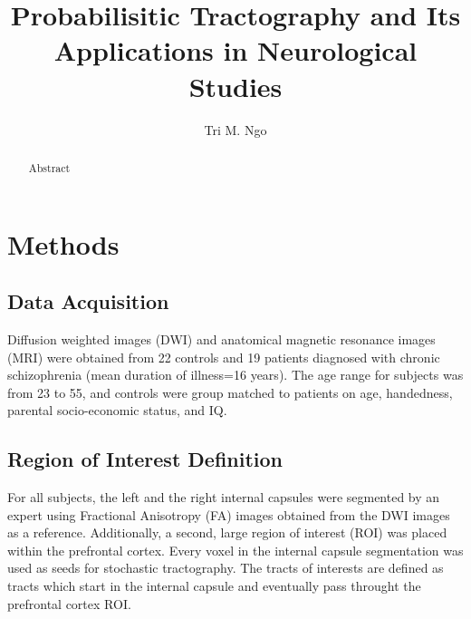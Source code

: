 \documentclass{article}
\author{Tri M. Ngo}
\title{Probabilisitic Tractography and Its Applications in Neurological Studies}
\begin{document}
\maketitle

\begin{abstract}
Abstract
\end{abstract}

\section{Methods}

  


  
\subsection{Data Acquisition}
Diffusion weighted images (DWI) and anatomical magnetic resonance images (MRI) were obtained from 22 controls and 19 patients diagnosed with chronic schizophrenia (mean duration of illness=16 years). The age range for subjects was from 23 to 55, and controls were group matched to patients on age, handedness, parental socio-economic status, and IQ. 

\subsection{Region of Interest Definition}
For all subjects, the left and the right internal capsules were segmented by an expert using Fractional Anisotropy (FA) images obtained from the DWI images as a reference. Additionally, a second, large region of interest (ROI) was placed within the prefrontal cortex.  Every voxel in the internal capsule segmentation was used as seeds for stochastic tractography.  The tracts of interests are defined as tracts which start in the internal capsule and eventually pass throught the prefrontal cortex ROI.
\end{document}
